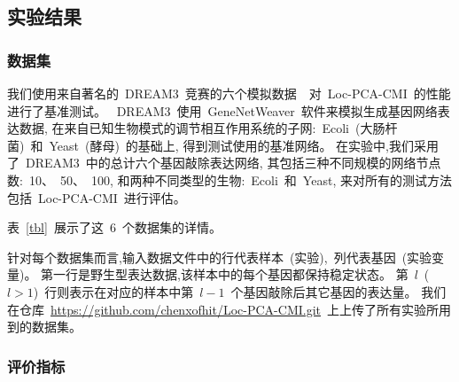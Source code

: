 \subsection{实验结果}

\subsubsection{数据集}

我们使用来自著名的~DREAM3~竞赛的六个模拟数据~\cite{schaffter2011genenetweaver}~对~Loc-PCA-CMI~的性能进行了基准测试。
~DREAM3~使用~GeneNetWeaver~软件来模拟生成基因网络表达数据,
在来自已知生物模式的调节相互作用系统的子网:~Ecoli~(大肠杆菌)~和~Yeast~(酵母)~的基础上,
得到测试使用的基准网络。 
在实验中,我们采用了~DREAM3~中的总计六个基因敲除表达网络,
其包括三种不同规模的网络节点数:~10、~50、~100, 和两种不同类型的生物:~Ecoli~和~Yeast, 来对所有的测试方法包括~Loc-PCA-CMI~进行评估。

表~\ref{tbl}~展示了这~6~个数据集的详情。
\begin{table} [!htbp]
\caption{实验所使用的数据集描述} 
\label{tbl} 
\begin{center}
\end{center}
\end{table} 

针对每个数据集而言,输入数据文件中的行代表样本~(实验),~列代表基因~(实验变量)。
第一行是野生型表达数据,该样本中的每个基因都保持稳定状态。
第~$l$~($l>1$)~行则表示在对应的样本中第~$l-1$~个基因敲除后其它基因的表达量。
我们在仓库~\url{https://github.com/chenxofhit/Loc-PCA-CMI.git}~上上传了所有实验所用到的数据集。

\subsubsection{评价指标}

